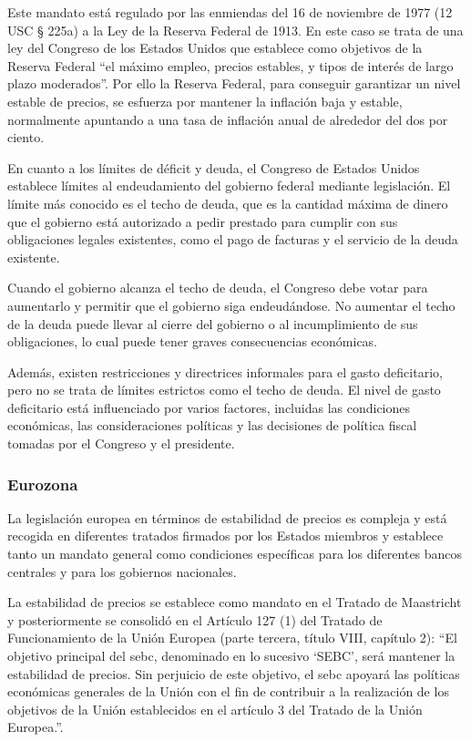 \documentclass[titlepage, 12pt]{article}
\begin{document}
Este mandato está regulado por las enmiendas del 16 de noviembre de 1977 (12 USC § 225a) a la Ley de la Reserva Federal de 1913. En este caso se trata de una ley del Congreso de los Estados Unidos que establece como objetivos de la Reserva Federal \enquote{el máximo empleo, precios estables, y tipos de interés de largo plazo moderados}. Por ello la Reserva Federal, para conseguir garantizar un nivel estable de precios, se esfuerza por mantener la inflación baja y estable, normalmente apuntando a una tasa de inflación anual de alrededor del dos por ciento.

En cuanto a los límites de déficit y deuda, el Congreso de Estados Unidos establece límites al endeudamiento del gobierno federal mediante legislación. El límite más conocido es el techo de deuda, que es la cantidad máxima de dinero que el gobierno está autorizado a pedir prestado para cumplir con sus obligaciones legales existentes, como el pago de facturas y el servicio de la deuda existente.

Cuando el gobierno alcanza el techo de deuda, el Congreso debe votar para aumentarlo y permitir que el gobierno siga endeudándose. No aumentar el techo de la deuda puede llevar al cierre del gobierno o al incumplimiento de sus obligaciones, lo cual puede tener graves consecuencias económicas.

Además, existen restricciones y directrices informales para el gasto deficitario, pero no se trata de límites estrictos como el techo de deuda. El nivel de gasto deficitario está influenciado por varios factores, incluidas las condiciones económicas, las consideraciones políticas y las decisiones de política fiscal tomadas por el Congreso y el presidente.

\subsubsection{Eurozona}

La legislación europea en términos de estabilidad de precios es compleja y está recogida en diferentes tratados firmados por los Estados miembros \autocite{lemos2023} y establece tanto un mandato general como condiciones específicas para los diferentes bancos centrales y para los gobiernos nacionales.

La estabilidad de precios se establece como mandato en el Tratado de Maastricht y posteriormente se consolidó en el Artículo 127 (1) del Tratado de Funcionamiento de la Unión Europea (parte tercera, título VIII, capítulo 2): \enquote{El objetivo principal del \acrfull{sebc}, denominado en lo sucesivo \enquote{SEBC}, será mantener la estabilidad de precios. Sin perjuicio de este objetivo, el \acrshort{sebc} apoyará las políticas económicas generales de la Unión con el fin de contribuir a la realización de los objetivos de la Unión establecidos en el artículo 3 del Tratado de la Unión Europea.}.
\end{document}
